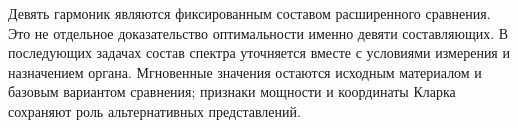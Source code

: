 Девять гармоник являются фиксированным составом
расширенного сравнения. Это не отдельное доказательство
оптимальности именно девяти составляющих.
В последующих задачах состав спектра уточняется
вместе с условиями измерения и назначением органа.
Мгновенные значения остаются исходным материалом
и базовым вариантом сравнения; признаки мощности
и координаты Кларка сохраняют роль альтернативных представлений.
